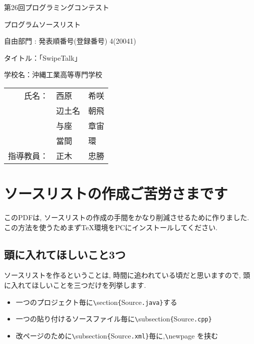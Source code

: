 \documentclass[11pt,a4j]{jarticle}
\begin{document}
\vspace*{-20mm}
{\Large

\begin{flushleft}
第26回プログラミングコンテスト
\end{flushleft}

\vspace{-15mm}
\begin{flushright}
プログラムソースリスト
\end{flushright}
}

\vspace{20mm}

\begin{center}
{\huge

{自由部門 : 発表順番号(登録番号)  4(20041)}

\vspace{20mm}
タイトル：「SwipeTalk」


\vspace{20mm}
学校名：沖縄工業高等専門学校\\

\hspace{0mm}
\vspace{0mm}

\begin{tabular}{r l l}
氏名：& 西原 & 希咲\\
	 & 辺土名 & 朝飛 \\
	 & 与座 & 章宙 \\
	 & 當間 & 環 \\
指導教員：& 正木 & 忠勝 \\
\end{tabular}
}

\end{center}


\thispagestyle{empty}
\newpage

\thispagestyle{empty}
\tableofcontents

\thispagestyle{empty}
\newpage
\setcounter{page}{1}

\section{ソースリストの作成ご苦労さまです}
このPDFは, ソースリストの作成の手間をかなり削減させるために作りました.
この方法を使うためまずTeX環境をPCにインストールしてください.\\

\subsection{頭に入れてほしいこと3つ}
ソースリストを作るということは, 時間に追われている頃だと思いますので,
頭に入れてほしいことを三つだけを列挙します.
\begin{itemize}
\item 一つのプロジェクト毎に\verb|\|section\verb|{|Source\verb|.java}|する
\item 一つの貼り付けるソースファイル毎に\verb|\|subsection\verb|{|Source\verb|.cpp}|
\item 改ページのために\verb|\|subsection\verb|{|Source\verb|.xml}|毎に,\verb|\|newpage を挟む
\end{itemize}
\end{document}
